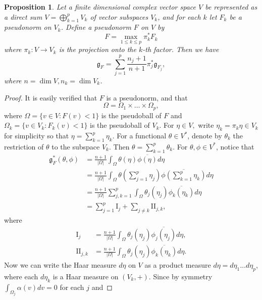 \documentclass[a4paper,11pt,reqno]{amsart}
\theoremstyle{plain}
\newtheorem{proposition}[equation]{Proposition}
\theoremstyle{definition}
\theoremstyle{remark}
\theoremstyle{remark}
\numberwithin{equation}{section}
\newcommand{\abs}[1]{\left\vert#1\right\vert}
\newcommand{\ol}{\overline}
\newcommand{\g}{\mathfrak{g}}
\newcommand{\red}[1]{{\color{red}{#1}}} %
\begin{document}
\begin{proposition} \label{prop-product}
    Let a finite dimensional complex vector space $V$ be represented as a direct sum $V=\bigoplus_{k=1}^p V_k$ of vector subspaces $V_k$, and for each $k$ let $F_k$ be a pseudonorm on $V_k$. Define a pseudonorm $F$ on $V$ by 
    \[F=\max_{1\leq k \leq p} \pi_k^* F_k\]
    where $\pi_k: V\to V_k$ is the projection onto the $k$-th factor. 
    Then we have 
    \[ \g_F= \sum_{j=1}^p\frac{n_j+1}{n+1} \pi_j^*\g_{F_j}, \]
    where $n=\dim V, n_k=\dim V_k$.
    
\end{proposition}
\begin{proof} It is easily verified that $F$ is a pseudonorm, and that 
\[ \Omega= \Omega_1\times \dots \times \Omega_p,\]
where $\Omega=\{v\in V: F(v)<1\}$ is the pseudoball of $F$ and $\Omega_k=\{v\in V_k: F_k(v)<1\}$ is the pseudoball of $V_k$. For $\eta\in V,$
write $\eta_k=\pi_k\eta\in V_k$ for simplicity so that $\eta= \sum_{k=1}^p \eta_k$. For a functional $\theta\in V^*$, denote by $\theta_k$ the restriction of $\theta$ to the    subspace $V_k$. Then $\theta= \sum_{k=1}^p \theta_k$. For $\theta, \phi\in V^*$, notice that 
\begin{align*}
    \g_F^*(\theta, \phi)&=\frac{n+1}{\abs{\Omega}} \int_\Omega \theta(\eta)\ol{\phi(\eta)}d\eta\\
    &= \frac{n+1}{\abs{\Omega}} \int_\Omega \theta\left(\sum_{j=1}^p \eta_j\right)\ol{\phi\left(\sum_{k=1}^p \eta_k\right)}d\eta\\
    &= \frac{n+1}{\abs{\Omega}} \sum_{j,k=1}^p \int_\Omega \theta_j(\eta_j)\ol{\phi_k(\eta_k)}d\eta\\ 
    &=\sum_{j=1}^p \mathrm{I}_j + \sum_{j\not=k}\mathrm{II}_{j,k}, 
\end{align*}
where 
\begin{align*}
    \mathrm{I}_j&=\frac{n+1}{\abs{\Omega}}\int_\Omega \theta_j(\eta_j)\ol{\phi_j(\eta_j)}d\eta,\\
    \mathrm{II}_{j,k}&= \frac{n+1}{\abs{\Omega}}\int_\Omega \theta_j(\eta_j)\ol{\phi_k(\eta_k)}d\eta.
\end{align*}
Now we can write the Haar measure $d\eta$ on $V$ as a product measure $d\eta=d\eta_1\dots d\eta_p$, where each $d\eta_k$ is a Haar measure on $(V_k,+).$ Since by symmetry $\int_{\Omega_j}\alpha(v)dv=0$ for each $j$ and

\end{proof}
\end{document}
